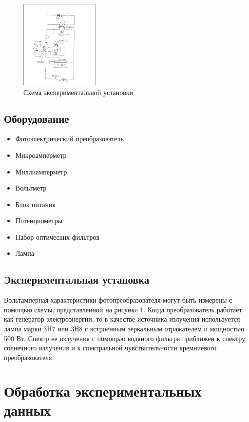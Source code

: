\documentclass[a4paper, 12pt]{extarticle}
\begin{document}
\begin{figure}[htbp]
    \centering
    \includegraphics[width = 0.35\textwidth]{pics/setup.png}
    \caption{Схема экспериментальной установки}
    \label{fig:setup}
\end{figure}
\subsection*{\textcolor{sub_header}{Оборудование}}

\begin{itemize}
    \item Фотоэлектрический преобразователь
    \item Микроамперметр
    \item Миллиамперметр
    \item Вольтметр
    \item Блок питания
    \item Потенциометры
    \item Набор оптических фильтров
    \item Лампа 
\end{itemize}

\subsection*{\textcolor{sub_header}{Экспериментальная установка}}


Вольтамперная характеристики фотопреобразователя могут быть измерены с помощью схемы, представленной на рисункe \ref{fig:setup}. Когда преобразователь работает как генератор электроэнергии, то в качестве источника излучения используется лампа марки 3H7 или 3Н8 с встроенным зеркальным отражателем и мощностью 500 Вт. Спектр ее излучения с помощью водяного фильтра приближен к спектру солнечного излучения и к спектральной чувствительности кремниевого преобразователя.



\section*{\textcolor{header}{Обработка экспериментальных данных}}
\end{document}

